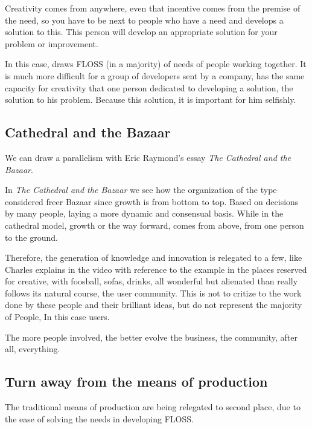 \documentclass[11pt]{scrartcl}
\begin{document}
Creativity comes from anywhere, even that incentive comes from the premise of the need, so you have to be next to people who have a need and develops a solution to this. This person will develop an appropriate solution for your problem or improvement.

In this case, draws FLOSS (in a majority) of needs of people working together. It is much more difficult for a group of developers sent by a company, has the same capacity for creativity that one person dedicated to developing a solution, the solution to his problem. Because this solution, it is important for him selfishly.

\subsection{Cathedral and the Bazaar}
\label{sub:cat-baz}

\par We can draw a parallelism with Eric Raymond's essay \emph{The Cathedral and the Bazaar}\cite{cat-baz}.

\par In \emph{The Cathedral and the Bazaar} we see how the organization of the type considered freer Bazaar since growth is from bottom to top. Based on decisions by many people, laying a more dynamic and consensual basis. While in the cathedral model, growth or the way forward, comes from above, from one person to the ground.

\par Therefore, the generation of knowledge and innovation is relegated to a few, like Charles explains in the video with reference to the example in the places reserved for creative, with foosball, sofas, drinks, all wonderful but alienated than really follows its natural course, the user community. This is not to critize to the work done by these people and their brilliant ideas, but do not represent the majority of People, In this case users.

\par The more people involved, the better evolve the business, the community, after all, everything.

\subsection{Turn away from the means of production}
\label{sub:turn-production}

\par The traditional means of production are being relegated to second place, due to the ease of solving the needs in developing FLOSS.
\end{document}
